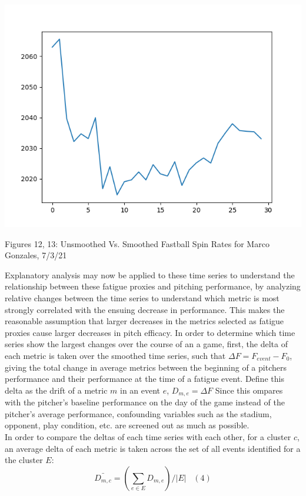\documentclass[12 pt]{article}
\begin{document}
\includegraphics[scale = .5]{figs/smoothed.png}
\begin{center}
    Figures 12, 13: Unsmoothed Vs. Smoothed Fastball Spin Rates for Marco Gonzales, 
    7/3/21
\end{center}
\indent Explanatory analysis may now be applied to these time series to understand the relationship 
between these fatigue proxies and pitching performance, by analyzing relative changes 
between the time series to understand which metric is most strongly correlated 
with the ensuing decrease in performance. This makes the reasonable assumption that 
larger decreases in the metrics selected as fatigue proxies cause larger decreases 
in pitch efficacy. In order to determine which time series show the largest changes 
over the course of an a game, first, the delta of each metric is taken over the 
smoothed time series, such that $\Delta F = F_{event} - F_{0}$, giving the total 
change in average metrics between the beginning of a pitchers performance and 
their performance at the time of a fatigue event. Define this delta as the drift of a metric $m$ in an event $e$, $D_{m, e} = \Delta F$
Since this ompares with the pitcher's
baseline performance on the day of the game instead of the pitcher's average performance,
confounding variables such as the stadium, opponent, play condition, etc. are screened 
out as much as possible.
\\ \indent In order to compare the deltas of each time series with each other, 
for a cluster $c$, an average delta of each metric is taken across the set of all events identified for 
a the cluster $E$: \[\bar{D_{m, c}} = (\sum_{e \in E}D_{m, e}) / |E|\;\;\;(4)\]
\end{document}
